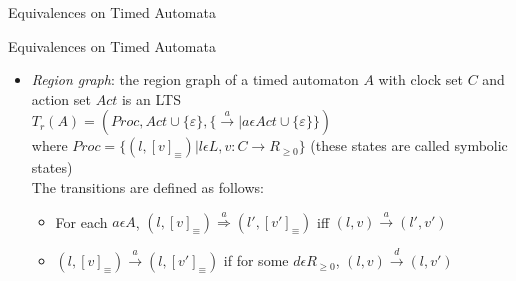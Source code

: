 \documentclass{beamer}
\begin{document}
\begin{frame}{Equivalences on Timed Automata}


\end{frame}

\begin{frame}{Equivalences on Timed Automata}

  \begin{itemize}

  \item \emph{Region graph}: the region graph of a timed automaton $A$ with clock set $C$
    and action set $Act$ is an LTS\\
    $T_r(A) = (Proc,Act \cup \{\varepsilon\}, \{\xrightarrow{a}|a \epsilon
    Act \cup \{\varepsilon\}\})$\\
    where $Proc = \{(l, [v]_{\equiv}) | l \epsilon L, v: C \rightarrow
    R_{\ge 0}\}$ (these states are called symbolic states)\\
    The transitions are defined as follows:
    \begin{itemize}
    \item For each $a \epsilon A$, $(l, [v]_{\equiv})
      \overset{a}{\Rightarrow} (l', [v']_{\equiv})$ iff $(l,v)
      \overset{a}{\rightarrow} (l', v')$
    \item $(l, [v]_{\equiv}) \xrightarrow{a} (l, [v']_{\equiv})$ if
      for some $d \epsilon R_{\ge 0}$, $(l, v) \xrightarrow{d} (l,
      v')$
    \end{itemize}

  \end{itemize}

\end{frame}
\end{document}
